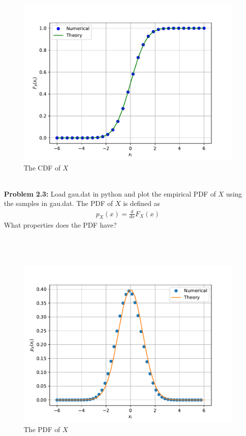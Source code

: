\documentclass[journal,12pt,twocolumn]{IEEEtran}
\begin{document}
\solution
\begin{figure}[!ht]
    \centering
    \includegraphics[width=\columnwidth]{./figs/gauss_cdf}
    \caption{The CDF of $X$}
    \label{fig:gauss_cdf}
\end{figure}\\
\textbf{Problem 2.3: }Load gau.dat in python and plot the empirical PDF of $X$ using the samples in gau.dat. The PDF of $X$ is defined as
\begin{align}
p_{X}(x) = \frac{d}{dx}F_{X}(x)
\end{align}
What properties does the PDF have?\\
\solution \\\\\\
\begin{figure}[!ht]
    \centering
    \includegraphics[width=\columnwidth]{./figs/gauss_pdf}
    \caption{The PDF of $X$}
    \label{fig:gauss_pdf}
\end{figure}\\
\end{document}
